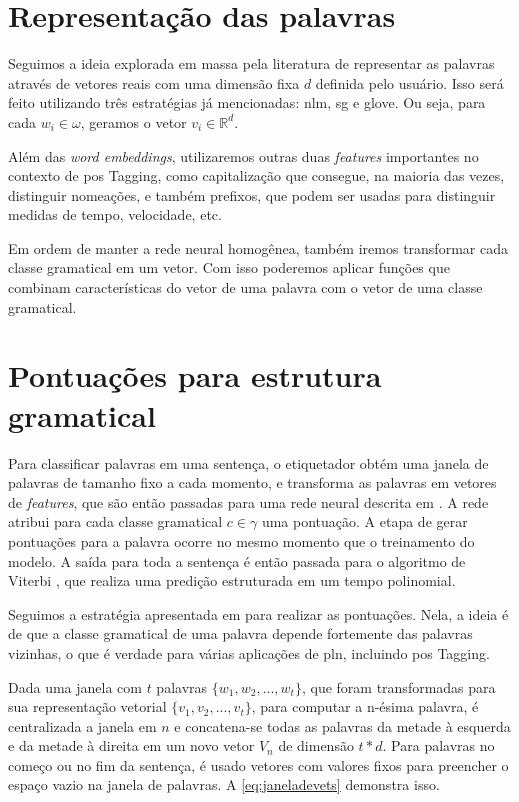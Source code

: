 \section{Representação das palavras}

Seguimos a ideia explorada em massa pela literatura de representar as palavras através de vetores reais com uma dimensão fixa $d$ definida pelo usuário. Isso será feito utilizando três estratégias já mencionadas: \ac{nlm}, \ac{sg} e \ac{glove}. Ou seja, para cada $w_i \in \omega$, geramos o vetor $v_i \in \mathbb{R}^d $.

Além das \textit{word embeddings}, utilizaremos outras duas \textit{features} importantes no contexto de \ac{pos} Tagging, como capitalização que consegue, na maioria das vezes, distinguir nomeações, e também prefixos, que podem ser usadas para distinguir medidas de tempo, velocidade, etc. 

Em ordem de manter a rede neural homogênea, também iremos transformar cada classe gramatical em um vetor. Com isso poderemos aplicar funções que combinam características do vetor de uma palavra com o vetor de uma classe gramatical.


\section{Pontuações para estrutura gramatical}

Para classificar palavras em uma sentença, o etiquetador obtém uma janela de palavras de tamanho fixo a cada momento, e transforma as palavras em vetores de \textit{features}, que são então passadas para uma rede neural descrita em \cite{collobert2008unified}. A rede atribui para cada classe gramatical $c \in \gamma$ uma pontuação. A etapa de gerar pontuações para a palavra ocorre no mesmo momento que o treinamento do modelo. A saída para toda a sentença é então passada para o algoritmo de Viterbi \cite{viterbi1967error}, que realiza uma predição estruturada em um tempo polinomial.

Seguimos a estratégia apresentada em \cite{dos2014training} para realizar as pontuações. Nela, a ideia é de que a classe gramatical de uma palavra depende fortemente das palavras vizinhas, o que é verdade para várias aplicações de \ac{pln}, incluindo \ac{pos} Tagging.

Dada uma janela com $t$ palavras $\{w_1, w_2, ..., w_t\}$, que foram transformadas para sua representação vetorial $\{v_1, v_2, ..., v_t\}$, para computar a n-ésima palavra, é centralizada a janela em $n$ e concatena-se todas as palavras da metade à esquerda e da metade à direita em um novo vetor $V_n$ de dimensão $t * d$. Para palavras no começo ou no fim da sentença, é usado vetores com valores fixos para preencher o espaço vazio na janela de palavras. A \autoref{eq:janeladevets} demonstra isso.

